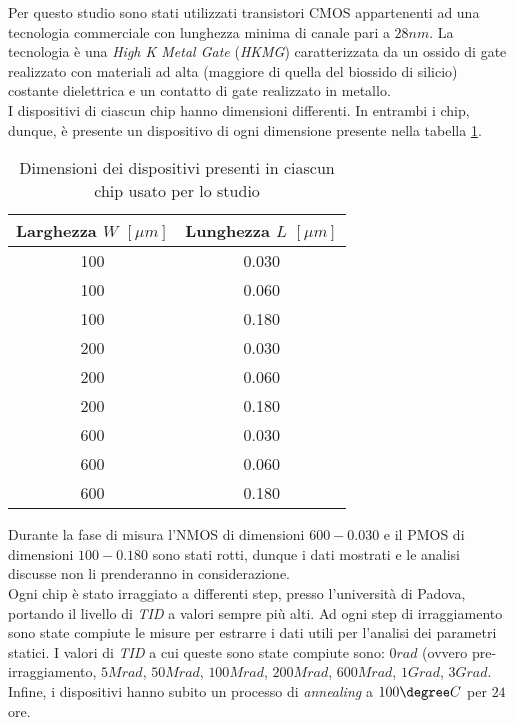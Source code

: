 Per questo studio sono stati utilizzati transistori CMOS appartenenti ad una tecnologia commerciale con lunghezza minima di canale pari a $28nm$. La tecnologia è una \textit{High K Metal Gate} (\textit{HKMG}) caratterizzata da un ossido di gate realizzato con materiali ad alta (maggiore di quella del biossido di silicio) costante dielettrica e un contatto di gate realizzato in metallo.\\

I dispositivi di ciascun chip hanno dimensioni differenti. In entrambi i chip, dunque, è presente un dispositivo di ogni dimensione presente nella tabella \ref{tab:dimensioniMOSFET}.

\begin{table}[ht]
  \renewcommand{\arraystretch}{1.3}
  \centering
    \begin{tabular}{c c }
      \toprule
          Larghezza $W$ $[\mu m]$ & Lunghezza $L$ $[\mu m]$ \\
     \midrule
	   100 & 0.030 \\
	\hline
	   100 & 0.060 \\
	\hline
	   100 & 0.180 \\
	\hline
	   200 & 0.030 \\
 	\hline
	   200 & 0.060 \\
	\hline
	   200 & 0.180 \\
	\hline
 	   600 & 0.030 \\
	\hline
	   600 & 0.060 \\
	\hline
	   600 & 0.180 \\
      \bottomrule
    \end{tabular}
 
  \caption{Dimensioni dei dispositivi presenti in ciascun chip usato per lo studio}
  \label{tab:dimensioniMOSFET}
\end{table}

Durante la fase di misura l'NMOS di dimensioni $600-0.030$ e il PMOS di dimensioni $100-0.180$ sono stati rotti, dunque i dati mostrati e le analisi discusse non li prenderanno in considerazione.\\

Ogni chip è stato irraggiato a differenti step, presso l'università di Padova, portando il livello di \emph{TID} a valori sempre più alti. Ad ogni step di irraggiamento sono state compiute le misure per estrarre i dati utili per l'analisi dei parametri statici. I valori di \emph{TID} a cui queste sono state compiute sono: $0 rad$ (ovvero pre-irraggiamento, $5 Mrad$, $50 Mrad$, $100 Mrad$, $200 Mrad$, $600 Mrad$, $1 Grad$, $3 Grad$. Infine, i dispositivi hanno subito un processo di \emph{annealing} a $100\degree C$ per $24$ ore.

